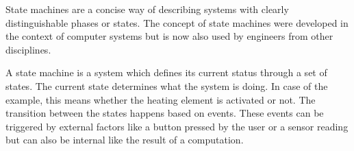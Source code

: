 
State machines are a concise way of describing systems with clearly distinguishable phases or states. The concept of state machines were developed in the context of computer systems but is now also used by engineers from other disciplines.

A state machine is a system which defines its current status through a set of states. The current state determines what the system is doing. In case of the example, this means whether the heating element is activated or not. The transition between the states happens based on events. These events can be triggered by external factors like a button pressed by the user or a sensor reading but can also be internal like the result of a computation.

